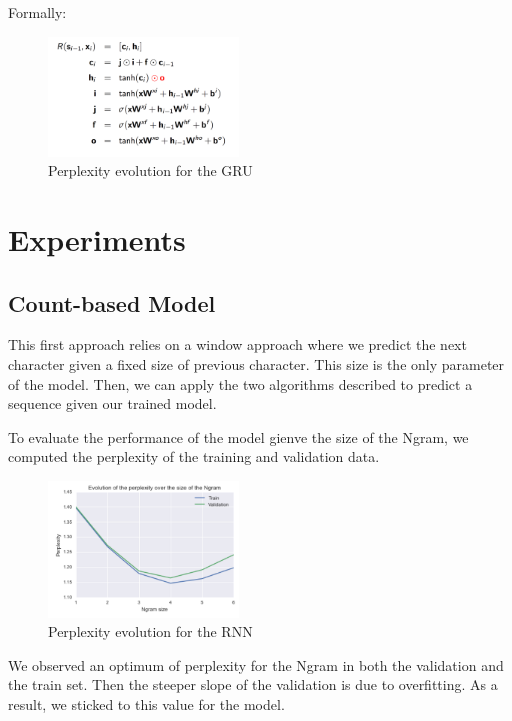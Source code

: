 \documentclass[11pt]{article}
\begin{document}
Formally:

\begin{figure}[H]
\begin{center}
    \includegraphics[width=0.45\textwidth]{lstm_eq.png}
    \caption{Perplexity evolution for the GRU}
\end{center}
\end{figure}


\section{Experiments}

\subsection{Count-based Model}

This first approach relies on a window approach where we predict the next character given a fixed size of previous character. This size is the only parameter of the model. Then, we can apply the two algorithms described to predict a sequence given our trained model. 

To evaluate the performance of the model gienve the size of the Ngram, we computed the perplexity of the training and validation data.

\begin{figure}[H]
\begin{center}
    \includegraphics[width=0.45\textwidth]{count_graph.png}
    \caption{Perplexity evolution for the RNN}
\end{center}
\end{figure}

We observed an optimum of perplexity for the Ngram in both the validation and the train set. Then the steeper slope of the validation is due to overfitting. As a result, we sticked to this value for the model.\\
\end{document}
